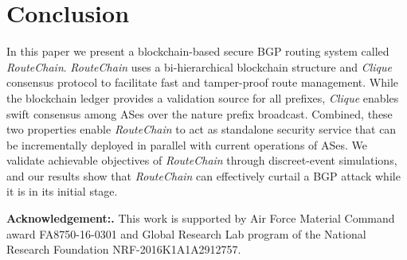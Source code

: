 \documentclass[conference]{IEEEtran}
\newcommand{\BfPara}[1]{{\noindent\bf#1.}\xspace}
\newcommand{\rc}{{{\em RouteChain}}\xspace}
\newcommand{\etal}{{\em et al.}\xspace}
\begin{document}




\section{Conclusion}\label{sec:conclusion}
In this paper we present a blockchain-based secure BGP routing system called \rc. \rc uses a bi-hierarchical blockchain structure and {\em Clique} consensus protocol to facilitate fast and tamper-proof route management. While the blockchain ledger provides a validation source for all prefixes, {\em Clique} enables swift consensus among ASes over the nature prefix broadcast. Combined, these two properties enable \rc to act as standalone security service that can be incrementally deployed in parallel with current operations of ASes. We validate achievable objectives of \rc through discreet-event simulations, and our results show that \rc can effectively curtail a BGP attack while it is in its initial stage.  


\BfPara{Acknowledgement:}This work is supported by Air Force Material Command award FA8750-16-0301 and Global Research Lab program of the National Research Foundation NRF-2016K1A1A2912757.

\balance



\end{document}
